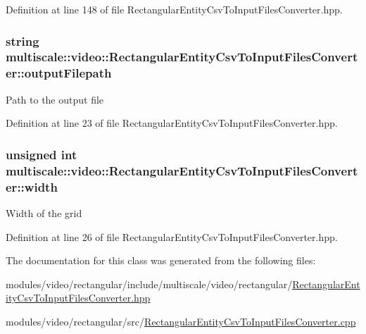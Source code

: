 Definition at line 148 of file Rectangular\-Entity\-Csv\-To\-Input\-Files\-Converter.\-hpp.

\hypertarget{classmultiscale_1_1video_1_1RectangularEntityCsvToInputFilesConverter_a84ea5fc8e195a17eb929812f962cb851}{
\subsubsection[{output\-Filepath}]{\setlength{\rightskip}{0pt plus 5cm}string multiscale\-::video\-::\-Rectangular\-Entity\-Csv\-To\-Input\-Files\-Converter\-::output\-Filepath\hspace{0.3cm}{\ttfamily [private]}}}\label{classmultiscale_1_1video_1_1RectangularEntityCsvToInputFilesConverter_a84ea5fc8e195a17eb929812f962cb851}
Path to the output file 

Definition at line 23 of file Rectangular\-Entity\-Csv\-To\-Input\-Files\-Converter.\-hpp.

\hypertarget{classmultiscale_1_1video_1_1RectangularEntityCsvToInputFilesConverter_ac4542ad4008e85ab4860146eed6e0200}{
\subsubsection[{width}]{\setlength{\rightskip}{0pt plus 5cm}unsigned int multiscale\-::video\-::\-Rectangular\-Entity\-Csv\-To\-Input\-Files\-Converter\-::width\hspace{0.3cm}{\ttfamily [private]}}}\label{classmultiscale_1_1video_1_1RectangularEntityCsvToInputFilesConverter_ac4542ad4008e85ab4860146eed6e0200}
Width of the grid 

Definition at line 26 of file Rectangular\-Entity\-Csv\-To\-Input\-Files\-Converter.\-hpp.



The documentation for this class was generated from the following files\-:\begin{DoxyCompactItemize}
\item 
modules/video/rectangular/include/multiscale/video/rectangular/\hyperlink{RectangularEntityCsvToInputFilesConverter_8hpp}{Rectangular\-Entity\-Csv\-To\-Input\-Files\-Converter.\-hpp}\item 
modules/video/rectangular/src/\hyperlink{RectangularEntityCsvToInputFilesConverter_8cpp}{Rectangular\-Entity\-Csv\-To\-Input\-Files\-Converter.\-cpp}\end{DoxyCompactItemize}
